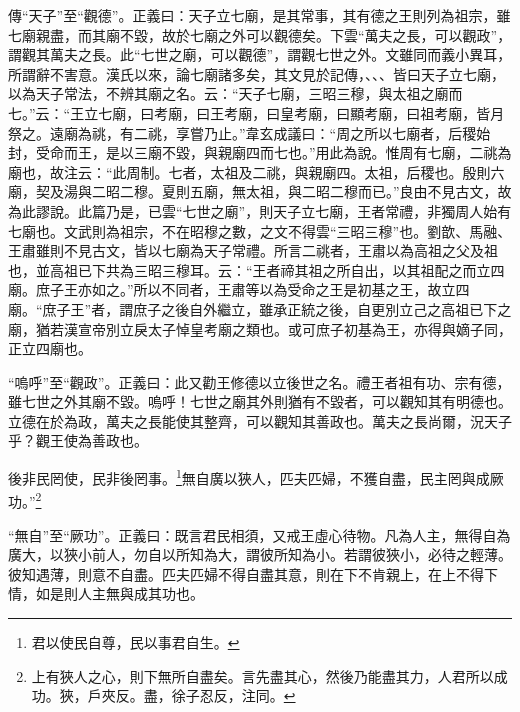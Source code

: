 {\noindent\zhuan{}\fzbyks 傳“天子”至“觀德”。正義曰：天子立七廟，是其常事，其有德之王則列為祖宗，雖七廟親盡，而其廟不毀，故於七廟之外可以觀德矣。下雲“萬夫之長，可以觀政”，謂觀其萬夫之長。此“七世之廟，可以觀德”，謂觀七世之外。文雖同而義小異耳，所謂辭不害意。漢氏以來，論七廟諸多矣，其文見於記傳，、、、皆曰天子立七廟，以為天子常法，不辨其廟之名。云：“天子七廟，三昭三穆，與太祖之廟而七。”云：“王立七廟，曰考廟，曰王考廟，曰皇考廟，曰顯考廟，曰祖考廟，皆月祭之。遠廟為祧，有二祧，享嘗乃止。”韋玄成議曰：“周之所以七廟者，后稷始封，受命而王，是以三廟不毀，與親廟四而七也。”用此為說。惟周有七廟，二祧為廟也，故注云：“此周制。七者，太祖及二祧，與親廟四。太祖，后稷也。殷則六廟，契及湯與二昭二穆。夏則五廟，無太祖，與二昭二穆而已。”良由不見古文，故為此謬說。此篇乃是，已雲“七世之廟”，則天子立七廟，王者常禮，非獨周人始有七廟也。文武則為祖宗，不在昭穆之數，之文不得雲“三昭三穆”也。劉歆、馬融、王肅雖則不見古文，皆以七廟為天子常禮。所言二祧者，王肅以為高祖之父及祖也，並高祖已下共為三昭三穆耳。云：“王者禘其祖之所自出，以其祖配之而立四廟。庶子王亦如之。”所以不同者，王肅等以為受命之王是初基之王，故立四廟。“庶子王”者，謂庶子之後自外繼立，雖承正統之後，自更別立己之高祖已下之廟，猶若漢宣帝別立戾太子悼皇考廟之類也。或可庶子初基為王，亦得與嫡子同，正立四廟也。 \par}

{\noindent\shu{}\fzkt “嗚呼”至“觀政”。正義曰：此又勸王修德以立後世之名。禮王者祖有功、宗有德，雖七世之外其廟不毀。嗚呼！七世之廟其外則猶有不毀者，可以觀知其有明德也。立德在於為政，萬夫之長能使其整齊，可以觀知其善政也。萬夫之長尚爾，況天子乎？觀王使為善政也。 \par}

後非民罔使，民非後罔事。\footnote{君以使民自尊，民以事君自生。}無自廣以狹人，匹夫匹婦，不獲自盡，民主罔與成厥功。”\footnote{上有狹人之心，則下無所自盡矣。言先盡其心，然後乃能盡其力，人君所以成功。狹，戶夾反。盡，徐子忍反，注同。}

{\noindent\shu{}\fzkt “無自”至“厥功”。正義曰：既言君民相須，又戒王虛心待物。凡為人主，無得自為廣大，以狹小前人，勿自以所知為大，謂彼所知為小。若謂彼狹小，必待之輕薄。彼知遇薄，則意不自盡。匹夫匹婦不得自盡其意，則在下不肯親上，在上不得下情，如是則人主無與成其功也。 \par}

